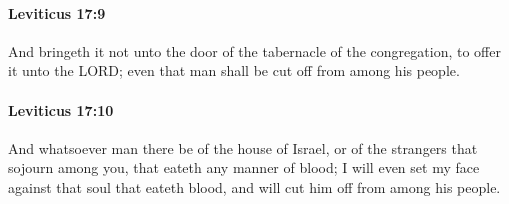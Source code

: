 		\paragraph{Leviticus 17:9} %
			\label{LEVITICUS-17-9}

			And bringeth it not unto the door of the tabernacle of the congregation, to offer it unto the LORD; even that man shall be cut off from among his people.


		\paragraph{Leviticus 17:10} %
			\label{LEVITICUS-17-10}

			And whatsoever man there be of the house of Israel, or of the strangers that sojourn among you, that eateth any manner of blood; I will even set my face against that soul that eateth blood, and will cut him off from among his people.

